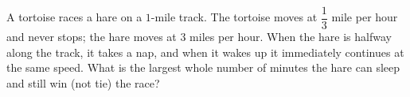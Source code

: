 A tortoise races a hare on a $1$-mile track. The tortoise moves at $\dfrac13$ mile per hour and never stops; the hare moves at $3$ miles per hour. When the hare is halfway along the track, it takes a nap, and when it wakes up it immediately continues at the same speed. What is the largest whole number of minutes the hare can sleep and still win (not tie) the race?
